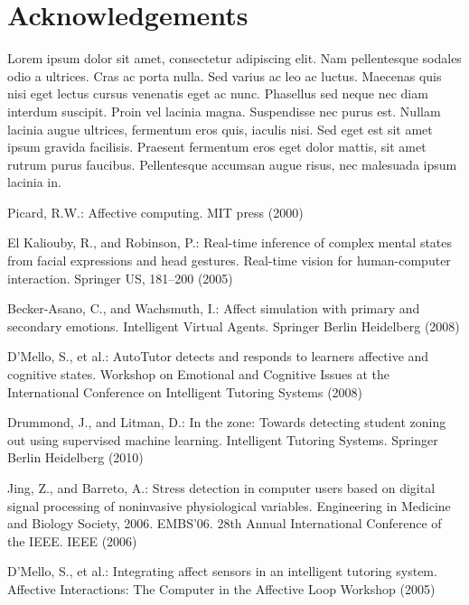 \documentclass[runningheads,a4paper]{llncs}
\begin{document}
\section*{Acknowledgements}
\label{acknowledgements}

Lorem ipsum dolor sit amet, consectetur adipiscing elit. Nam pellentesque sodales odio a ultrices. Cras ac porta nulla. Sed varius ac leo ac luctus. Maecenas quis nisi eget lectus cursus venenatis eget ac nunc. Phasellus sed neque nec diam interdum suscipit. Proin vel lacinia magna. Suspendisse nec purus est. Nullam lacinia augue ultrices, fermentum eros quis, iaculis nisi. Sed eget est sit amet ipsum gravida facilisis. Praesent fermentum eros eget dolor mattis, sit amet rutrum purus faucibus. Pellentesque accumsan augue risus, nec malesuada ipsum lacinia in.

\begin{thebibliography}{4}
  
 Picard, R.W.: Affective computing. MIT press (2000)
  
 El Kaliouby, R., and Robinson, P.: Real-time inference of complex mental states from facial expressions and head gestures. Real-time vision for human-computer interaction. Springer US, 181--200 (2005)

 Becker-Asano, C., and Wachsmuth, I.: Affect simulation with primary and secondary emotions. Intelligent Virtual Agents. Springer Berlin Heidelberg (2008)

 D'Mello, S., et al.: AutoTutor detects and responds to learners affective and cognitive states. Workshop on Emotional and Cognitive Issues at the International Conference on Intelligent Tutoring Systems (2008)

 Drummond, J., and Litman, D.: In the zone: Towards detecting student zoning out using supervised machine learning. Intelligent Tutoring Systems. Springer Berlin Heidelberg (2010)

 Jing, Z., and Barreto, A.: Stress detection in computer users based on digital signal processing of noninvasive physiological variables. Engineering in Medicine and Biology Society, 2006. EMBS'06. 28th Annual International Conference of the IEEE. IEEE (2006)

 D'Mello, S., et al.: Integrating affect sensors in an intelligent tutoring system. Affective Interactions: The Computer in the Affective Loop Workshop (2005)


\end{thebibliography}
\end{document}
